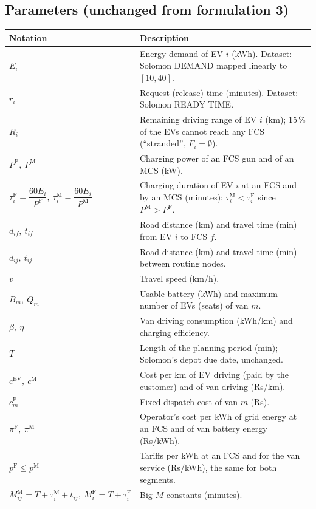 \documentclass[12pt,a4paper]{article}
\begin{document}
\subsection*{Parameters (unchanged from formulation 3)}
{\small
\begin{tabularx}{\textwidth}{@{}>{\raggedright\arraybackslash}p{4.6cm}X@{}}
\toprule
\textbf{Notation} & \textbf{Description} \\
\midrule
$E_i$ & Energy demand of EV $i$ (kWh). Dataset: Solomon DEMAND mapped linearly to $[10,40]$. \\[2pt]
$r_i$ & Request (release) time (minutes). Dataset: Solomon READY TIME. \\[2pt]
$R_i$ & Remaining driving range of EV $i$ (km); 15\,\% of the EVs cannot reach any FCS (``stranded'', $F_i=\emptyset$). \\[2pt]
$P^{\mathrm F},\ P^{\mathrm M}$ & Charging power of an FCS gun and of an MCS (kW). \\[2pt]
$\tau^{\mathrm F}_i=\dfrac{60E_i}{P^{\mathrm F}},\ \tau^{\mathrm M}_i=\dfrac{60E_i}{P^{\mathrm M}}$ & Charging duration of EV $i$ at an FCS and by an MCS (minutes); $\tau^{\mathrm M}_i<\tau^{\mathrm F}_i$ since $P^{\mathrm M}>P^{\mathrm F}$. \\[2pt]
$d_{if},\ t_{if}$ & Road distance (km) and travel time (min) from EV $i$ to FCS $f$. \\[2pt]
$d_{ij},\ t_{ij}$ & Road distance (km) and travel time (min) between routing nodes. \\[2pt]
$v$ & Travel speed (km/h). \\[2pt]
$B_m,\ Q_m$ & Usable battery (kWh) and maximum number of EVs (seats) of van $m$. \\[2pt]
$\beta,\ \eta$ & Van driving consumption (kWh/km) and charging efficiency. \\[2pt]
$T$ & Length of the planning period (min); Solomon's depot due date, unchanged. \\[2pt]
$c^{\mathrm{EV}},\ c^{\mathrm M}$ & Cost per km of EV driving (paid by the customer) and of van driving (Rs/km). \\[2pt]
$c^{\mathrm F}_m$ & Fixed dispatch cost of van $m$ (Rs). \\[2pt]
$\pi^{\mathrm F},\ \pi^{\mathrm M}$ & Operator's cost per kWh of grid energy at an FCS and of van battery energy (Rs/kWh). \\[2pt]
$p^{\mathrm F}\le p^{\mathrm M}$ & Tariffs per kWh at an FCS and for the van service (Rs/kWh), the same for both segments. \\[2pt]
$M^{\mathrm M}_{ij}=T+\tau^{\mathrm M}_i+t_{ij},\ M^{\mathrm F}_i=T+\tau^{\mathrm F}_i$ & Big-$M$ constants (minutes). \\
\bottomrule
\end{tabularx}}
\end{document}
